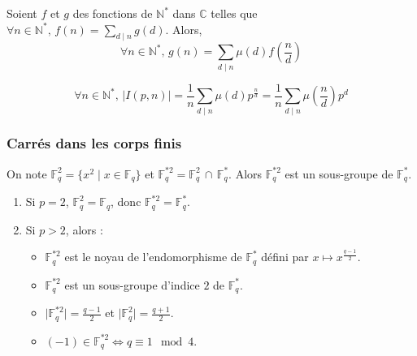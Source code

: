   \begin{theorem}
    Soient $f$ et $g$ des fonctions de $\mathbb{N}^*$ dans $\mathbb{C}$ telles que $\forall n \in \mathbb{N}^*, \, f(n) = \sum_{d \mid n} g(d)$. Alors,
    \[ \forall n \in \mathbb{N}^*, \, g(n) = \sum_{d \mid n} \mu(d) f \left( \frac{n}{d} \right) \]
  \end{theorem}

  \begin{corollary}
    \[ \forall n \in \mathbb{N}^*, \, \vert I(p,n) \vert = \frac{1}{n} \sum_{d \mid n} \mu(d) p^{\frac{n}{d}} = \frac{1}{n} \sum_{d \mid n} \mu \left( \frac{n}{d} \right) p^{d} \]
  \end{corollary}

  \subsubsection{Carrés dans les corps finis}


  \begin{proposition}
    On note $\mathbb{F}_q^2 = \{ x^2 \mid x \in \mathbb{F}_q \}$ et $\mathbb{F}_q^{*2} = \mathbb{F}_q^2 \, \cap \, \mathbb{F}_q^*$. Alors $\mathbb{F}_q^{*2}$ est un sous-groupe de $\mathbb{F}_q^*$.
  \end{proposition}

  \begin{proposition}
    \begin{enumerate}[label={\bfseries(\roman*)}]
      \item Si $p = 2$, $\mathbb{F}_q^2 = \mathbb{F}_q$, donc $\mathbb{F}_q^{*2} = \mathbb{F}_q^*$.
      \item Si $p > 2$, alors :
      \begin{itemize}
        \item $\mathbb{F}_q^{*2}$ est le noyau de l'endomorphisme de $\mathbb{F}_q^*$ défini par $x \mapsto x^{\frac{q-1}{2}}$.
        \item $\mathbb{F}_q^{*2}$ est un sous-groupe d'indice $2$ de $\mathbb{F}_q^*$.
        \item $\vert \mathbb{F}_q^{*2} \vert = \frac{q-1}{2}$ et $\vert \mathbb{F}_q^2 \vert = \frac{q+1}{2}$.
        \item $(-1) \in \mathbb{F}_q^{*2} \iff q \equiv 1 \mod 4$.
      \end{itemize}
    \end{enumerate}
  \end{proposition}

